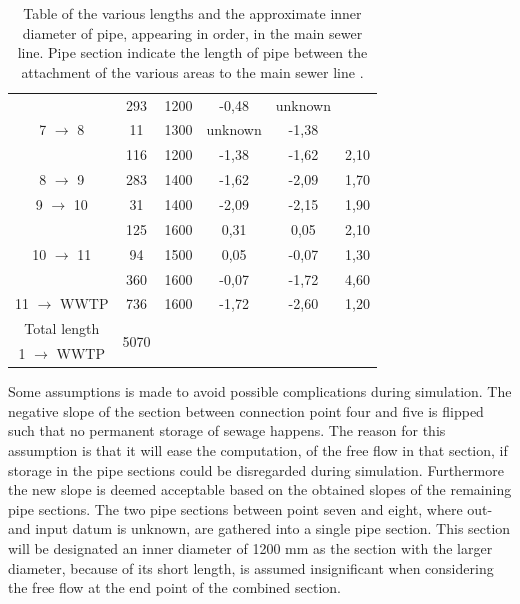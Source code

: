 \begin{table} [H]
\begin{tabular}{|c|c|c|c|c|c|}
 										 & 293			  & 1200   & -0,48  & unknown&  \\
7 $\rightarrow$ 8						 & 11 			  & 1300   & unknown& -1,38&  \\
			 							 & 116			  & 1200   & -1,38  & -1,62&  2,10\\ \hline
8 $\rightarrow$ 9						 & 283			  & 1400   & -1,62  & -2,09&  1,70\\ \hline
9 $\rightarrow$ 10						 & 31			  & 1400   & -2,09  & -2,15& 1,90 \\ \hline
										 & 125			  & 1600   & 0,31   & 0,05 & 2,10 \\
10 $\rightarrow$ 11	 	 				 & 94			  & 1500   & 0,05   & -0,07& 1,30\\
						 			 	 & 360 			  & 1600   & -0,07  & -1,72& 4,60 \\ \hline
11 $\rightarrow$ WWTP   				 & 736			  & 1600   & -1,72  & -2,60& 1,20\\ \hline
Total length 		    				 & \multirow{2}{*}{5070}  &	  & & & 	 \\ 
1 $\rightarrow$ WWTP    				 &						  &   & & & \\ \hline

\end{tabular}

\caption{Table of the various lengths and the approximate inner diameter of pipe, appearing in order, in the main sewer line. Pipe section indicate the length of pipe between the attachment of the various areas to the main sewer line \cite{GIS_kort}.} 
\label{tab:kloak_diameter}
\end{table}

Some assumptions is made to avoid possible complications during simulation. The negative slope of the section between connection point four and five is flipped such that no permanent storage of sewage happens. The reason for this assumption is that it will ease the computation, of the free flow in that section, if storage in the pipe sections could be disregarded during simulation. Furthermore the new slope is deemed acceptable based on the obtained slopes of the remaining pipe sections. 
The two pipe sections between point seven and eight, where out- and input datum is unknown, are gathered into a single pipe section. This section will be designated an inner diameter of 1200 mm as the section with the larger diameter, because of its short length, is assumed insignificant when considering the free flow at the end point of the combined section.

